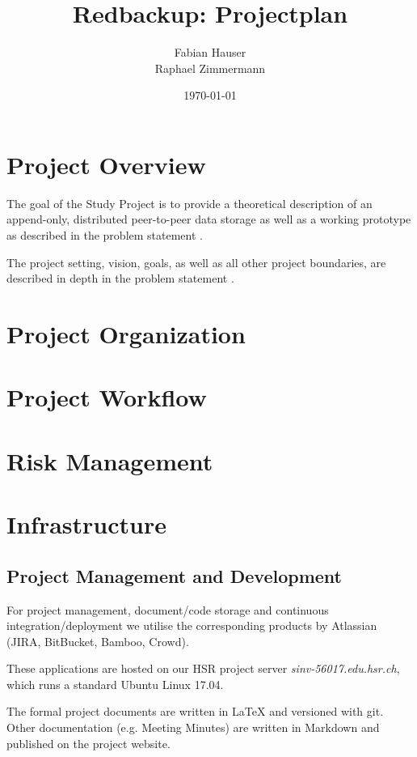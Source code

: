\documentclass[a4paper]{article}
\title{Redbackup: Projectplan}
\author{
		Fabian Hauser \\
		Raphael Zimmermann
}
\date{\today}
\begin{document}
\maketitle

\section{Project Overview}
The goal of the Study Project is to provide a theoretical description of an append-only, distributed peer-to-peer data storage as well as a working prototype as described in the problem statement \cite{problemstatement}.

The project setting, vision, goals, as well as all other project boundaries, are described in depth in the problem statement \cite{problemstatement}.

\section{Project Organization}


\section{Project Workflow}


\section{Risk Management}

\section{Infrastructure}


\subsection{Project Management and Development}

For project management, document/code storage and continuous integration/deployment we utilise the corresponding products by Atlassian (JIRA, BitBucket, Bamboo, Crowd)\cite{atlassian-opensource}.

These applications are hosted on our HSR project server \textit{sinv-56017.edu.hsr.ch}, which runs a standard Ubuntu Linux 17.04.

The formal project documents are written in LaTeX and versioned with git. Other documentation (e.g. Meeting Minutes) are written in Markdown and published on the project website.
\end{document}
